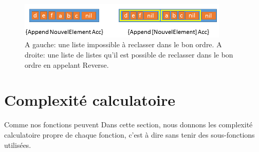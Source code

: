 \documentclass[10pt,a4paper]{article}
\begin{document}
\begin{figure}[h!]
\centering
\includegraphics[width=10cm]{images/AstuceAppend.png}
\caption{A gauche: une liste impossible à reclasser dans le bon ordre. A droite: une liste de listes qu'il est possible de reclasser dans le bon ordre en appelant Reverse.}
\label{fig:astuceReverse}
\end{figure}





\section{Complexité calculatoire}
Comme nos fonctions peuvent Dans cette section, nous donnons les complexité calculatoire
propre de chaque fonction, c'est à dire sans tenir des sous-fonctions
utilisées.
\end{document}
